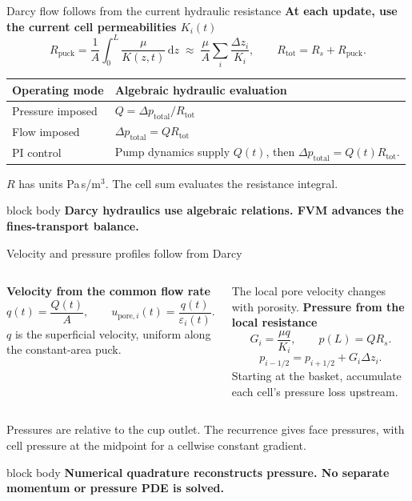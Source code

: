 \documentclass[aspectratio=169,11pt]{beamer}
\newcommand{\hi}[1]{\textcolor{tumblue}{\textbf{#1}}}
\newcommand{\takeaway}[1]{%
  \begin{beamercolorbox}[rounded=true,sep=.55em]{block body}
    \centering\color{tumdark}\textbf{#1}
  \end{beamercolorbox}}
\begin{document}
\begin{frame}{Darcy flow follows from the current hydraulic resistance}
\small
\hi{At each update, use the current cell permeabilities $K_i(t)$}
\[
R_{\mathrm{puck}}=\frac{1}{A}\int_0^L\frac{\mu}{K(z,t)}\,\mathrm dz
\;\approx\;\frac{\mu}{A}\sum_i\frac{\Delta z_i}{K_i},
\qquad R_{\mathrm{tot}}=R_s+R_{\mathrm{puck}}.
\]
\begin{tabular}{@{}>{\raggedright\arraybackslash}p{3cm}p{8.9cm}@{}}
\toprule
Operating mode & Algebraic hydraulic evaluation\\\midrule
Pressure imposed & $Q=\Delta p_{\mathrm{total}}/R_{\mathrm{tot}}$\\[.6em]
Flow imposed & $\Delta p_{\mathrm{total}}=Q R_{\mathrm{tot}}$\\[.6em]
PI control & Pump dynamics supply $Q(t)$, then $\Delta p_{\mathrm{total}}=Q(t)R_{\mathrm{tot}}$.\\\bottomrule
\end{tabular}
\par\medskip
\small $R$ has units Pa\,s/m$^3$. The cell sum evaluates the resistance integral.
\vfill\takeaway{Darcy hydraulics use algebraic relations. FVM advances the fines-transport balance.}
\end{frame}

\begin{frame}{Velocity and pressure profiles follow from Darcy}
\small
\begin{columns}[T,onlytextwidth]
\hi{Velocity from the common flow rate}
\[
q(t)=\frac{Q(t)}{A},\qquad
u_{\mathrm{pore},i}(t)=\frac{q(t)}{\varepsilon_i(t)}.
\]
$q$ is the superficial velocity, uniform along the constant-area puck.
\par\medskip
The local pore velocity changes with porosity.
\hi{Pressure from the local resistance}
\[
G_i=\frac{\mu q}{K_i},\qquad p(L)=Q R_s.
\]
\[
p_{i-1/2}=p_{i+1/2}+G_i\Delta z_i.
\]
Starting at the basket, accumulate each cell's pressure loss upstream.
\end{columns}
\medskip
\small Pressures are relative to the cup outlet. The recurrence gives face pressures, with cell pressure at the midpoint for a cellwise constant gradient.
\vfill\takeaway{Numerical quadrature reconstructs pressure. No separate momentum or pressure PDE is solved.}
\end{frame}
\end{document}

